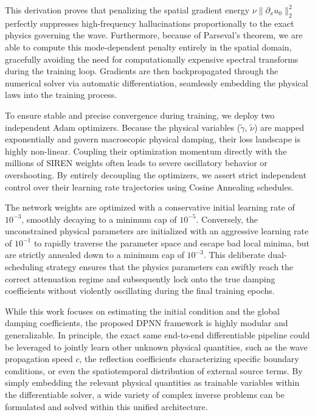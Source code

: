 \documentclass{Configuration_Files/PoliMi3i_thesis}
\begin{document}
This derivation proves that penalizing the spatial gradient energy $\nu \|\partial_x u_0\|_2^2$ perfectly suppresses high-frequency hallucinations proportionally to the exact physics governing the wave. Furthermore, because of Parseval's theorem, we are able to compute this mode-dependent penalty entirely in the spatial domain, gracefully avoiding the need for computationally expensive spectral transforms during the training loop. Gradients are then backpropagated through the numerical solver via automatic differentiation, seamlessly embedding the physical laws into the training process.

To ensure stable and precise convergence during training, we deploy two independent Adam optimizers. Because the physical variables ($\tilde{\gamma}$, $\tilde{\nu}$) are mapped exponentially and govern macroscopic physical damping, their loss landscape is highly non-linear. Coupling their optimization momentum directly with the millions of SIREN weights often leads to severe oscillatory behavior or overshooting. By entirely decoupling the optimizers, we assert strict independent control over their learning rate trajectories using Cosine Annealing schedules.

The network weights are optimized with a conservative initial learning rate of $10^{-3}$, smoothly decaying to a minimum cap of $10^{-5}$. Conversely, the unconstrained physical parameters are initialized with an aggressive learning rate of $10^{-1}$ to rapidly traverse the parameter space and escape bad local minima, but are strictly annealed down to a minimum cap of $10^{-3}$. This deliberate dual-scheduling strategy ensures that the physics parameters can swiftly reach the correct attenuation regime and subsequently lock onto the true damping coefficients without violently oscillating during the final training epochs.

While this work focuses on estimating the initial condition and the global damping coefficients, the proposed DPNN framework is highly modular and generalizable. In principle, the exact same end-to-end differentiable pipeline could be leveraged to jointly learn other unknown physical quantities, such as the wave propagation speed $c$, the reflection coefficients characterizing specific boundary conditions, or even the spatiotemporal distribution of external source terms. By simply embedding the relevant physical quantities as trainable variables within the differentiable solver, a wide variety of complex inverse problems can be formulated and solved within this unified architecture.
\end{document}
